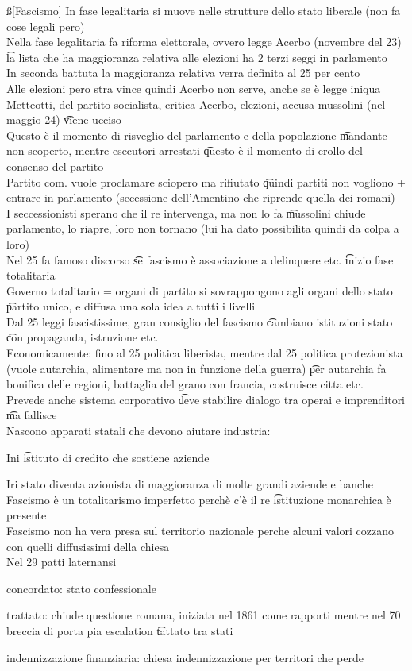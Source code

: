 \documentclass[12pt]{article}
\begin{document}
\ss[Fascismo]
In fase legalitaria si muove nelle strutture dello stato liberale (non fa cose legali pero) \\
Nella fase legalitaria fa riforma elettorale, ovvero legge Acerbo (novembre del 23) \t la lista che ha maggioranza relativa alle elezioni ha 2 terzi seggi in parlamento \\
In seconda battuta la maggioranza relativa verra definita al 25 per cento \\
Alle elezioni pero stra vince quindi Acerbo non serve, anche se è legge iniqua \\
Metteotti, del partito socialista, critica Acerbo, elezioni, accusa mussolini (nel maggio 24) \t viene ucciso \\
Questo è il momento di risveglio del parlamento e della popolazione \t mandante non scoperto, mentre esecutori arrestati \t questo è il momento di crollo del consenso del partito \\
Partito com. vuole proclamare sciopero ma rifiutato \t quindi partiti non vogliono + entrare in parlamento (secessione dell'Amentino che riprende quella dei romani) \\
I seccessionisti sperano che il re intervenga, ma non lo fa \t mussolini chiude parlamento, lo riapre, loro non tornano (lui ha dato possibilita quindi da colpa a loro) \\
Nel 25 fa famoso discorso \t se fascismo è associazione a delinquere etc. \t inizio fase totalitaria \\
Governo totalitario = organi di partito si sovrappongono agli organi dello stato \t partito unico, e diffusa una sola idea a tutti i livelli \\
Dal 25 leggi fascistissime, gran consiglio del fascismo \t cambiano istituzioni stato \t con propaganda, istruzione etc. \\
Economicamente: fino al 25 politica liberista, mentre dal 25 politica protezionista (vuole autarchia, alimentare ma non in funzione della guerra) \t per autarchia fa bonifica delle regioni, battaglia del grano con francia, costruisce citta etc. \\
Prevede anche sistema corporativo \t deve stabilire dialogo tra operai e imprenditori \t ma fallisce \\
Nascono apparati statali che devono aiutare industria:
\bi
  \item Ini \t istituto di credito che sostiene aziende 
  \item Iri stato diventa azionista di maggioranza di molte grandi aziende e banche
\ei
Fascismo è un totalitarismo imperfetto perchè c'è il re \t istituzione monarchica è presente \\
Fascismo non ha vera presa sul territorio nazionale perche alcuni valori cozzano con quelli diffusissimi della chiesa \\
Nel 29 patti laternansi
\bi
\item concordato: stato confessionale
\item trattato: chiude questione romana, iniziata nel 1861 come rapporti mentre nel 70 breccia di porta pia escalation \t tattato tra stati
\item indennizzazione finanziaria: chiesa indennizzazione per territori che perde
\ei
\end{document}
